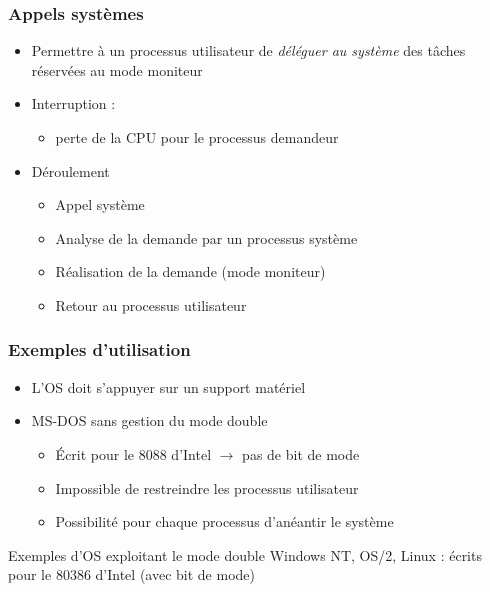 \begin{frame}
 \frametitle{Appels systèmes}
 \begin{itemize}
 \item Permettre à un processus utilisateur de \emph{déléguer au système} des tâches réservées au mode moniteur
 \item Interruption :
 \begin{itemize}
\item perte de la CPU pour le processus demandeur
\end{itemize}
 \item Déroulement
\begin{itemize}
\item Appel système
\item Analyse de la demande par un processus système
\item Réalisation de la demande (mode moniteur)
\item Retour au processus utilisateur
 \end{itemize}
 \end{itemize}
\end{frame}

\begin{frame}
 \frametitle{Exemples d’utilisation}
 \begin{itemize}
 \item L'OS doit s'appuyer sur un support matériel
 \item MS-DOS sans gestion du mode double
\begin{itemize}
\item Écrit pour le 8088 d’Intel $\rightarrow$ pas de bit de mode
\item Impossible de restreindre les processus utilisateur
\item Possibilité pour chaque processus d’anéantir le système
\end{itemize}
\end{itemize}

\begin{exampleblock}{Exemples d'OS exploitant le mode double}
Windows NT, OS/2, Linux : écrits pour le 80386 d’Intel (avec bit de mode)
\end{exampleblock}
\end{frame}

